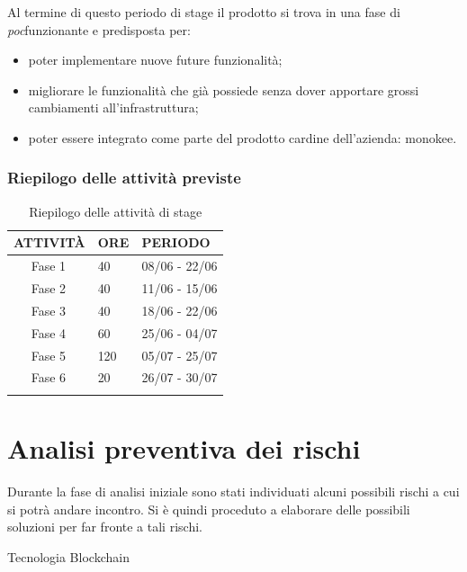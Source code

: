 Al termine di questo periodo di stage il prodotto si trova in una fase di \emph{\gls{poc}}\glsfirstoccur funzionante e predisposta per:
\begin{itemize}
	\item poter implementare nuove future funzionalità;
	\item migliorare le funzionalità che già possiede senza dover apportare grossi cambiamenti all'infrastruttura;
	\item poter essere integrato come parte del prodotto cardine dell'azienda: \gls{monokee}.
\end{itemize}

\subsubsection{Riepilogo delle attività previste}
\begin{longtable}{|r l|p{1cm}|p{3cm}|}
	\hline
	\multicolumn{2}{|c|}{\textbf{ATTIVITÀ}} & \textbf{ORE} & \textbf{PERIODO}\tabularnewline
	\hline
	& Fase 1 & \centerline{40} & 08/06 - 22/06 \\\hline	
	& Fase 2 & \centerline{40} & 11/06 - 15/06\\\hline
	& Fase 3 & \centerline{40} & 18/06 - 22/06\\\hline
	& Fase 4 & \centerline{60} & 25/06 - 04/07 \\\hline
	& Fase 5 & \centerline{120} & 05/07 - 25/07 \\\hline
	& Fase 6 & \centerline{20} & 26/07 - 30/07 \\\hline	
	\caption{Riepilogo delle attività di stage}
\end{longtable}

\section{Analisi preventiva dei rischi}

Durante la fase di analisi iniziale sono stati individuati alcuni possibili rischi a cui si potrà andare incontro.
Si è quindi proceduto a elaborare delle possibili soluzioni per far fronte a tali rischi.\\

\begin{risk}{Tecnologia Blockchain}
	\label{risk:new-technology}
\end{risk}

